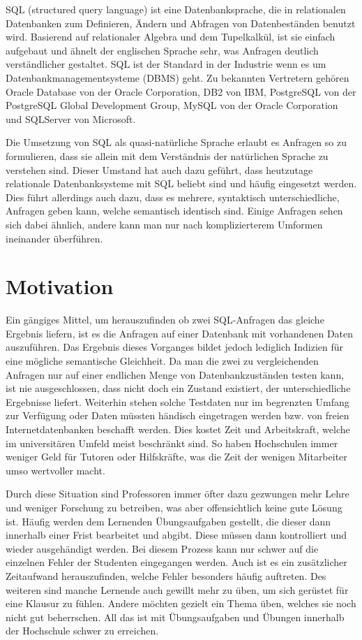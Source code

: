 
SQL (structured query language) ist eine Datenbanksprache, die in relationalen Datenbanken zum Definieren, Ändern und Abfragen von Datenbeständen benutzt wird. Basierend auf relationaler Algebra und dem Tupelkalkül, ist sie einfach aufgebaut und ähnelt der englischen Sprache sehr, was Anfragen deutlich verständlicher gestaltet. SQL ist der Standard in der Industrie wenn es um Datenbankmanagementsysteme (DBMS) geht. Zu bekannten Vertretern gehören Oracle Database von der Oracle Corporation, DB2 von IBM, PostgreSQL von der PostgreSQL Global Development Group, MySQL von der Oracle Corporation und SQLServer von Microsoft.

Die Umsetzung von SQL als quasi-natürliche Sprache erlaubt es Anfragen so zu formulieren, dass sie allein mit dem Verständnis der natürlichen Sprache zu verstehen sind. Dieser Umstand hat auch dazu geführt, dass heutzutage relationale Datenbanksysteme mit SQL beliebt sind und häufig eingesetzt werden. 
Dies führt allerdings auch dazu, dass es mehrere, syntaktisch unterschiedliche, Anfragen geben kann, welche semantisch identisch sind. Einige Anfragen sehen sich dabei ähnlich, andere kann man nur nach komplizierterem Umformen ineinander überführen. 

\section{Motivation}

Ein gängiges Mittel, um herauszufinden ob zwei SQL-Anfragen das gleiche Ergebnis liefern, ist es die Anfragen auf einer Datenbank mit vorhandenen Daten auszuführen. Das Ergebnis dieses Vorganges bildet jedoch lediglich Indizien für eine mögliche semantische Gleichheit. Da man die zwei zu vergleichenden Anfragen nur auf einer endlichen Menge von Datenbankzuständen testen kann, ist nie ausgeschlossen, dass nicht doch ein Zustand existiert, der unterschiedliche Ergebnisse liefert. Weiterhin stehen solche Testdaten nur im begrenzten Umfang zur Verfügung oder Daten müssten händisch eingetragen werden bzw. von freien Internetdatenbanken beschafft werden. Dies kostet Zeit und Arbeitskraft, welche im universitären Umfeld meist beschränkt sind. So haben Hochschulen immer weniger Geld für Tutoren oder Hilfskräfte, was die Zeit der wenigen Mitarbeiter umso wertvoller macht.

Durch diese Situation sind Professoren immer öfter dazu gezwungen mehr Lehre und weniger Forschung zu betreiben, was aber offensichtlich keine gute Lösung ist. Häufig werden dem Lernenden Übungsaufgaben gestellt, die dieser dann innerhalb einer Frist bearbeitet und abgibt. Diese müssen dann kontrolliert und wieder ausgehändigt werden. Bei diesem Prozess kann nur schwer auf die einzelnen Fehler der Studenten eingegangen werden. Auch ist es ein zusätzlicher Zeitaufwand herauszufinden, welche Fehler besonders häufig auftreten. Des weiteren sind manche Lernende auch gewillt mehr zu üben, um sich gerüstet für eine Klausur zu fühlen. Andere möchten gezielt ein Thema üben, welches sie noch nicht gut beherrschen. All das ist mit Übungsaufgaben und Übungen innerhalb der Hochschule schwer zu erreichen. 

